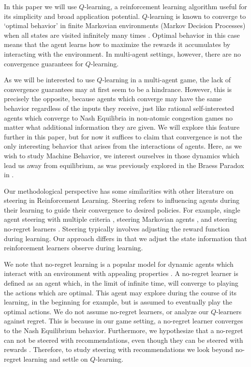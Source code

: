 In this paper we will use $Q$-learning, a reinforcement learning algorithm useful for its simplicity and broad application potential. $Q$-learning is known to converge to `optimal behavior' in finite Markovian environments (Markov Decision Processes) when all states are visited infinitely many times \cite{watkins1992q}. Optimal behavior in this case means that the agent learns how to maximize the rewards it accumulates by interacting with the environment. In multi-agent settings, however, there are no convergence guarantees for $Q$-learning.

As we will be interested to use $Q$-learning in a multi-agent game, the lack of convergence guarantees may at first seem to be a hindrance. However, this is precisely the opposite, because agents which converge may have the same behavior regardless of the inputs they receive, just like rational self-interested agents which converge to Nash Equilibria in non-atomic congestion games no matter what additional information they are given. We will explore this feature further in this paper, but for now it suffices to claim that convergence is not the only interesting behavior that arises from the interactions of agents. Here, as we wish to study Machine Behavior, we interest ourselves in those dynamics which lead us away from equilibrium, as was previously explored in the Braess Paradox in \cite{carissimo2024counter}.

Our methodological perspective has some similarities with other literature on steering in Reinforcement Learning. Steering refers to influencing agents during their learning to guide their convergence to desired policies. For example, single agent steering with multiple criteria \cite{mannor2001steering}, steering Markovian agents \cite{huang2024learning}, and  steering no-regret learners \cite{zhang2023steering}. Steering typically involves adjusting the reward function during learning. Our approach differs in that we adjust the state information that reinforcement learners observe during learning.

We note that no-regret learning is a popular model for dynamic agents which interact with an environment with appealing properties \cite{hart2000simple}. A no-regret learner is defined as an agent which, in the limit of infinite time, will converge to playing the actions which are optimal. This agent may explore during the course of its learning, in the beginning for example, but is assumed to eventually play the optimal actions. We do not assume no-regret learners, or analyze our $Q$-learners against regret. This is because in our game setting, a no-regret learner converges to the Nash Equilibrium behavior. Furthermore, we hypothesize that a no-regret can not be steered with recommendations, even though they can be steered with rewards \cite{zhang2023steering}. Therefore, to study steering with recommendations we look beyond no-regret learning and settle on $Q$-learning.

